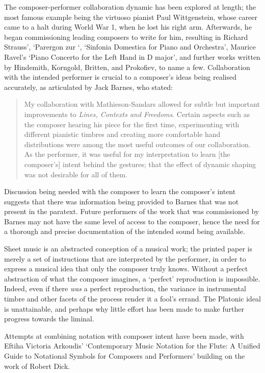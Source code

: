 The composer-performer collaboration dynamic has been explored at length; the most famous example being the virtuoso pianist Paul Wittgenstein, whose career came to a halt during World War 1, when he lost his right arm.
Afterwards, he began commissioning leading composers to write for him, resulting in Richard Strauss', `Parergon zur `, `Sinfonia Domestica for Piano and Orchestra', Maurice Ravel's `Piano Concerto for the Left Hand in D major', and further works written by Hindemith, Korngold, Britten, and Prokofiev, to name a few.\autocite[107]{predotaPaulWittgensteinVoice2014}
Collaboration with the intended performer is crucial to a composer's ideas being realised accurately, as articulated by Jack Barnes, who stated:
\begin{quotation}
    My collaboration with Mathieson-Sandars allowed for subtle but important improvements to \emph{Lines, Contexts and Freedoms}. 
    Certain aspects such as the composer hearing his piece for the first time, experimenting with different pianistic timbres and creating more comfortable hand distributions were among the most useful outcomes of our collaboration. 
    As the performer, it was useful for my interpretation to learn [the composer's] intent behind the gestures; that the effect of dynamic shaping was not desirable for all of them.\autocite[20]{jackbarnesExaminationComposerPerformerCollaborations2017}
\end{quotation}
Discussion being needed with the composer to learn the composer's intent suggests that there was information being provided to Barnes that was not present in the paratext.
Future performers of the work that was commissioned by Barnes may not have the same level of access to the composer, hence the need for a thorough and precise documentation of the intended sound being available.

Sheet music is an abstracted conception of a musical work; the printed paper is merely a set of instructions that are interpreted by the performer, in order to express a musical idea that only the composer truly knows.
Without a perfect abstraction of what the composer imagines, a `perfect' reproduction is impossible.
Indeed, even if there \emph{was} a perfect reproduction, the variance in instrumental timbre and other facets of the process render it a fool's errand.
The Platonic ideal is unattainable, and perhaps why little effort has been made to make further progress towards the liminal.\autocite{citation needed, obviously}

Attempts at combining notation with composer intent have been made, with Eftiha Victoria Arkoudis' `Contemporary Music Notation for the Flute: A Unified Guide to Notational Symbols for Composers and Performers' building on the work of Robert Dick.\autocite{arkoudisContemporaryMusicNotation2019}

